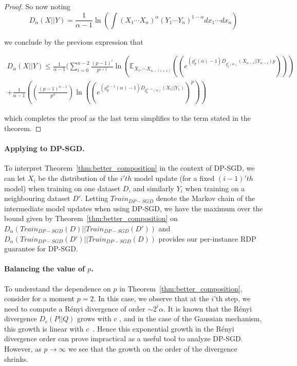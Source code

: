\begin{proof}
So now noting $$D_{\alpha}(X || Y) = \frac{1}{\alpha -1} \ln(\int (X_1 \cdots X_n)^{\alpha} (Y_1 \cdots Y_n)^{1 - \alpha} dx_1 \cdots dx_n)$$

we conclude by the previous expression that 

\begin{multline}
        D_{\alpha}(X || Y) \leq \frac{1}{\alpha -1} (\sum_{i=0}^{n-2} \frac{(p-1)^i}{p^{i+1}}  \ln (\mathbb{E}_{X_1,\cdots X_{n-(i+1)}}  ((e^{(g_p^{i}(\alpha) -1)D_{g_p^{i}(\alpha)}(X_{n-i}|| Y_{n-i})p}))) \\ + \frac{1}{\alpha -1} ((\frac{(p-1)^{n-1}}{p^n}) \ln ((e^{(g_p^{n-1}(\alpha) -1)D_{g_p^{n-1}(\alpha)}(X_{1}|| Y_{1})})^p)) 
    \end{multline}

which completes the proof as the last term simplifies to the term stated in the theorem.
\end{proof}


\paragraph{Applying to DP-SGD.} To interpret Theorem~\ref{thm:better_composition} in the context of DP-SGD, we can let $X_i$ be the distribution of the $i'th$ model update (for a fixed $(i-1)'th$ model) when training on one dataset $D$, and similarly $Y_i$ when training on a neighbouring dataset $D'$. Letting $Train_{DP-SGD}$ denote the Markov chain of the intermediate model updates when using DP-SGD, we have the maximum over the bound given by Theorem~\ref{thm:better_composition} on $D_{\alpha}(Train_{DP-SGD}(D)||Train_{DP-SGD}(D'))$ and $D_{\alpha}(Train_{DP-SGD}(D')||Train_{DP-SGD}(D))$ provides our per-instance RDP guarantee for DP-SGD.




\paragraph{Balancing the value of $p$.}To understand the dependence on $p$ in Theorem~\ref{thm:better_composition}, consider for a moment $p =2$. In this case, we observe that at the $i$'th step, we need to compute a R\'enyi divergence of order $\sim 2^{i} \alpha$. It is known that the R\'enyi divergence $D_{c}(P||Q)$ grows with $c$ \citep{van2014renyi}, and in the case of the Gaussian mechanism, this growth is linear with $c$~\citep{mironov2017renyi}. Hence this exponential growth in the R\'enyi divergence order can prove impractical as a useful tool to analyze DP-SGD. However, as $p \rightarrow \infty$ we see that the growth on the order of the divergence shrinks.

